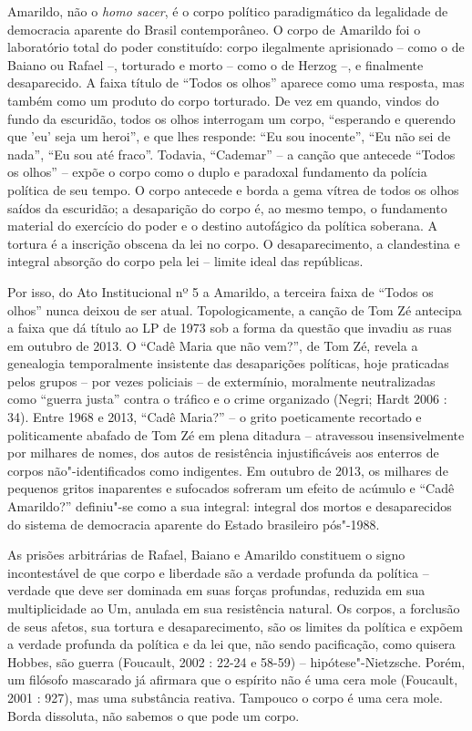 Amarildo, não o \emph{homo sacer}, é o corpo político paradigmático da
legalidade de democracia aparente do Brasil contemporâneo. O corpo de
Amarildo foi o laboratório total do poder constituído: corpo ilegalmente
aprisionado -- como o de Baiano ou Rafael --, torturado e morto -- como
o de Herzog --, e finalmente desaparecido. A faixa título de ``Todos os
olhos'' aparece como uma resposta, mas também como um produto do corpo
torturado. De vez em quando, vindos do fundo da escuridão, todos os
olhos interrogam um corpo, ``esperando e querendo que 'eu' seja um
heroi'', e que lhes responde: ``Eu sou inocente'', ``Eu não sei de
nada'', ``Eu sou até fraco''. Todavia, ``Cademar'' -- a canção que
antecede ``Todos os olhos'' -- expõe o corpo como o duplo e paradoxal
fundamento da polícia política de seu tempo. O corpo antecede e borda a
gema vítrea de todos os olhos saídos da escuridão; a desaparição do
corpo é, ao mesmo tempo, o fundamento material do exercício do poder e o
destino autofágico da política soberana. A tortura é a inscrição obscena
da lei no corpo. O desaparecimento, a clandestina e integral absorção do
corpo pela lei -- limite ideal das repúblicas.

Por isso, do Ato Institucional nº 5 a Amarildo, a terceira faixa de
``Todos os olhos'' nunca deixou de ser atual. Topologicamente, a canção
de Tom Zé antecipa a faixa que dá título ao LP de 1973 sob a forma da
questão que invadiu as ruas em outubro de 2013. O ``Cadê Maria que não
vem?'', de Tom Zé, revela a genealogia temporalmente insistente das
desaparições políticas, hoje praticadas pelos grupos -- por vezes
policiais -- de extermínio, moralmente neutralizadas como ``guerra
justa'' contra o tráfico e o crime organizado (Negri; Hardt 2006 : 34).
Entre 1968 e 2013, ``Cadê Maria?'' -- o grito poeticamente recortado e
politicamente abafado de Tom Zé em plena ditadura -- atravessou
insensivelmente por milhares de nomes, dos autos de resistência
injustificáveis aos enterros de corpos não"-identificados como
indigentes. Em outubro de 2013, os milhares de pequenos gritos
inaparentes e sufocados sofreram um efeito de acúmulo e ``Cadê
Amarildo?'' definiu"-se como a sua integral: integral dos mortos e
desaparecidos do sistema de democracia aparente do Estado brasileiro
pós"-1988.

As prisões arbitrárias de Rafael, Baiano e Amarildo constituem o signo
incontestável de que corpo e liberdade são a verdade profunda da
política -- verdade que deve ser dominada em suas forças profundas,
reduzida em sua multiplicidade ao Um, anulada em sua resistência
natural. Os corpos, a forclusão de seus afetos, sua tortura e
desaparecimento, são os limites da política e expõem a verdade profunda
da política e da lei que, não sendo pacificação, como quisera Hobbes,
são guerra (Foucault, 2002 : 22-24 e 58-59) -- hipótese"-Nietzsche.
Porém, um filósofo mascarado já afirmara que o espírito não é uma cera
mole (Foucault, 2001 : 927), mas uma substância reativa. Tampouco o
corpo é uma cera mole. Borda dissoluta, não sabemos o que pode um corpo.

